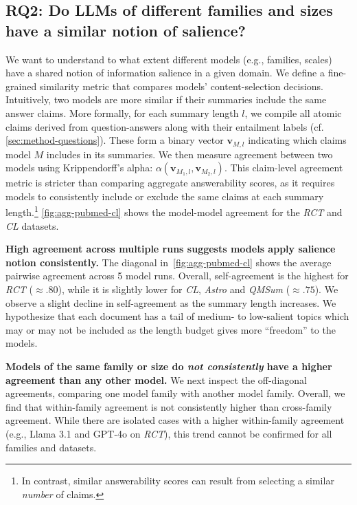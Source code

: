 \subsection{RQ2: Do LLMs of different families and sizes have a similar notion of salience?}
\label{sec:results-model-model-similarity}
We want to understand to what extent different models (e.g., families, scales) have a shared notion of information salience in a given domain.
We define a fine-grained similarity metric that compares models' content-selection decisions.
Intuitively, two models are more similar if their summaries include the same answer claims.
More formally, for each summary length $l$, we compile all atomic claims derived from question-answers along with their entailment labels (cf. \cref{sec:method-questions}). These form a binary vector $\mathbf{v}_{M,l}$ indicating which claims model $M$ includes in its summaries.
We then measure agreement between two models using Krippendorff's alpha: $\alpha(\mathbf{v}_{M_1,l}, \mathbf{v}_{M_2,l})$.
This claim-level agreement metric is stricter than comparing aggregate answerability scores, as it requires models to consistently include or exclude the same claims at each summary length.\footnote{In contrast, similar answerability scores can result from selecting a similar \emph{number} of claims.}
\cref{fig:agg-pubmed-cl} shows the model-model agreement for the \emph{RCT} and \emph{CL} datasets.

\textbf{High agreement across multiple runs suggests models apply salience notion consistently.}
The diagonal in~\cref{fig:agg-pubmed-cl} shows the average pairwise agreement across 5 model runs.
Overall, self-agreement is the highest for \emph{RCT} ($\approx .80$), while it is slightly lower for \emph{CL}, \emph{Astro} and \emph{QMSum} ($\approx .75$).
We observe a slight decline in self-agreement as the summary length increases.
We hypothesize that each document has a tail of medium- to low-salient topics which may or may not be included as the length budget gives more ``freedom'' to the models.

\textbf{Models of the same family or size do \emph{not consistently} have a higher agreement than any other model.}
We next inspect the off-diagonal agreements, comparing one model family with another model family.
Overall, we find that within-family agreement is not consistently higher than cross-family agreement.
While there are isolated cases with a higher within-family agreement (e.g., Llama 3.1 and GPT-4o on \emph{RCT}), this trend cannot be confirmed for all families and datasets.

